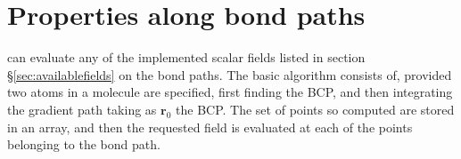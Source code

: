 \section{Properties along bond paths}

\DTK{} can evaluate any of the implemented scalar fields listed in section \S\ref{sec:availablefields} on the bond paths. The basic algorithm consists of, provided two atoms in a molecule are specified, first finding the BCP, and then integrating the gradient path taking as $\boldsymbol{r}_0$ the BCP. The set of points so computed are stored in an array, and then the requested field is evaluated at each of the points belonging to the bond path.











